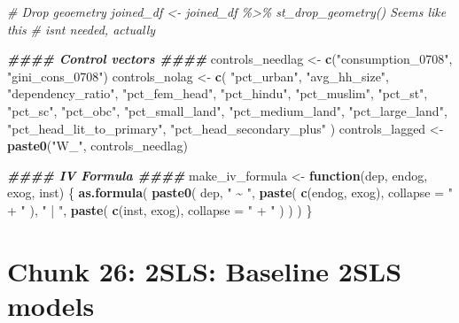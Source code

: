 \documentclass[
]{article}
\newenvironment{Shaded}{\begin{snugshade}}{\end{snugshade}}
\newcommand{\AttributeTok}[1]{\textcolor[rgb]{0.13,0.29,0.53}{#1}}
\newcommand{\CommentTok}[1]{\textcolor[rgb]{0.56,0.35,0.01}{\textit{#1}}}
\newcommand{\ControlFlowTok}[1]{\textcolor[rgb]{0.13,0.29,0.53}{\textbf{#1}}}
\newcommand{\DocumentationTok}[1]{\textcolor[rgb]{0.56,0.35,0.01}{\textbf{\textit{#1}}}}
\newcommand{\FunctionTok}[1]{\textcolor[rgb]{0.13,0.29,0.53}{\textbf{#1}}}
\newcommand{\NormalTok}[1]{#1}
\newcommand{\OtherTok}[1]{\textcolor[rgb]{0.56,0.35,0.01}{#1}}
\newcommand{\StringTok}[1]{\textcolor[rgb]{0.31,0.60,0.02}{#1}}
\begin{document}
\begin{Shaded}
\begin{Highlighting}[]
\CommentTok{\# Drop geoemetry joined\_df \textless{}{-} joined\_df \%\textgreater{}\% st\_drop\_geometry() Seems like this}
\CommentTok{\# isn\textquotesingle{}t needed, actually}


\DocumentationTok{\#\#\#\# Control vectors \#\#\#\#}
\NormalTok{controls\_needlag }\OtherTok{\textless{}{-}} \FunctionTok{c}\NormalTok{(}\StringTok{"consumption\_0708"}\NormalTok{, }\StringTok{"gini\_cons\_0708"}\NormalTok{)}
\NormalTok{controls\_nolag }\OtherTok{\textless{}{-}} \FunctionTok{c}\NormalTok{(}
    \StringTok{"pct\_urban"}\NormalTok{, }\StringTok{"avg\_hh\_size"}\NormalTok{, }\StringTok{"dependency\_ratio"}\NormalTok{, }\StringTok{"pct\_fem\_head"}\NormalTok{,}
    \StringTok{"pct\_hindu"}\NormalTok{, }\StringTok{"pct\_muslim"}\NormalTok{, }\StringTok{"pct\_st"}\NormalTok{, }\StringTok{"pct\_sc"}\NormalTok{, }\StringTok{"pct\_obc"}\NormalTok{, }\StringTok{"pct\_small\_land"}\NormalTok{,}
    \StringTok{"pct\_medium\_land"}\NormalTok{, }\StringTok{"pct\_large\_land"}\NormalTok{, }\StringTok{"pct\_head\_lit\_to\_primary"}\NormalTok{,}
    \StringTok{"pct\_head\_secondary\_plus"}
\NormalTok{)}
\NormalTok{controls\_lagged }\OtherTok{\textless{}{-}} \FunctionTok{paste0}\NormalTok{(}\StringTok{"W\_"}\NormalTok{, controls\_needlag)}


\DocumentationTok{\#\#\#\# IV Formula \#\#\#\#}
\NormalTok{make\_iv\_formula }\OtherTok{\textless{}{-}} \ControlFlowTok{function}\NormalTok{(dep, endog, exog, inst) \{}
    \FunctionTok{as.formula}\NormalTok{(}
        \FunctionTok{paste0}\NormalTok{(}
\NormalTok{            dep, }\StringTok{" \textasciitilde{} "}\NormalTok{, }\FunctionTok{paste}\NormalTok{(}
                \FunctionTok{c}\NormalTok{(endog, exog),}
                \AttributeTok{collapse =} \StringTok{" + "}
\NormalTok{            ),}
            \StringTok{" | "}\NormalTok{, }\FunctionTok{paste}\NormalTok{(}
                \FunctionTok{c}\NormalTok{(inst, exog),}
                \AttributeTok{collapse =} \StringTok{" + "}
\NormalTok{            )}
\NormalTok{        )}
\NormalTok{    )}
\NormalTok{\}}
\end{Highlighting}
\end{Shaded}

\section*{Chunk 26: 2SLS: Baseline 2SLS models}\label{chunk-26-2sls-baseline-2sls-models}
\end{document}

